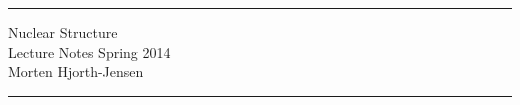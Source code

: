 \documentclass[10pt,a4wide,twoside]{book}
\newcommand{\clearemptydoublepage}{\newpage{\pagestyle{empty}\cleardoublepage}}
\begin{document}
\thispagestyle{empty}
    \rule{\linewidth}{1mm}
    \begin{flushright}
          \Huge Nuclear Structure\\ Lecture Notes Spring 2014\\[5mm]
           Morten Hjorth-Jensen
    \end{flushright}
    \rule{\linewidth}{1mm}
\begin{center}
\begin{figure}[hb]
\end{figure}
\end{center}


\clearemptydoublepage

\pagestyle{fancy}



\tableofcontents

\clearemptydoublepage


%




 \clearemptydoublepage

 \clearemptydoublepage

 \clearemptydoublepage

 \clearemptydoublepage

 \clearemptydoublepage


 \clearemptydoublepage



%
 
\end{document}
